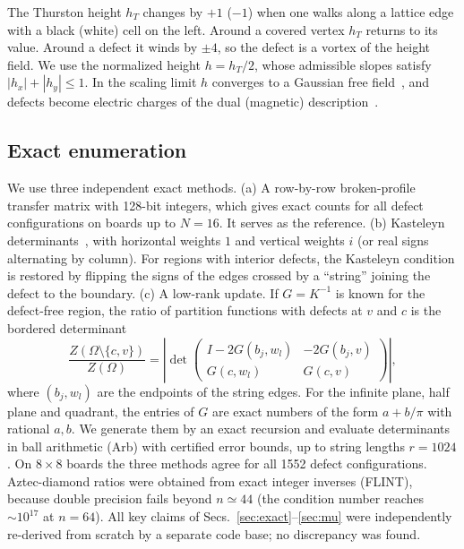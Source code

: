 \documentclass[aps,pre,twocolumn,superscriptaddress,nofootinbib,floatfix]{revtex4-2}
\begin{document}
The Thurston height $h_T$ changes by $+1$ ($-1$) when one walks along a lattice edge with a black (white) cell on the left. Around a covered vertex $h_T$ returns to its value. Around a defect it winds by $\pm4$, so the defect is a vortex of the height field. We use the normalized height $h=h_T/2$, whose admissible slopes satisfy $|h_x|+|h_y|\le1$. In the scaling limit $h$ converges to a Gaussian free field~\cite{Kenyon2000,Kenyon2001}, and defects become electric charges of the dual (magnetic) description~\cite{Nienhuis1984,Henley2010}.

\subsection{Exact enumeration}
We use three independent exact methods.
(a) A row-by-row broken-profile transfer matrix with 128-bit integers, which gives exact counts for all defect configurations on boards up to $N=16$. It serves as the reference.
(b) Kasteleyn determinants~\cite{Kasteleyn1961}, with horizontal weights $1$ and vertical weights $i$ (or real signs alternating by column). For regions with interior defects, the Kasteleyn condition is restored by flipping the signs of the edges crossed by a ``string'' joining the defect to the boundary.
(c) A low-rank update. If $G=K^{-1}$ is known for the defect-free region, the ratio of partition functions with defects at $v$ and $c$ is the bordered determinant
\begin{equation}
\frac{Z(\Omega\setminus\{c,v\})}{Z(\Omega)}=\left|\det\begin{pmatrix}I-2G(b_j,w_l) & -2G(b_j,v)\\ G(c,w_l) & G(c,v)\end{pmatrix}\right|,
\label{eq:bordered}
\end{equation}
where $(b_j,w_l)$ are the endpoints of the string edges.
For the infinite plane, half plane and quadrant, the entries of $G$ are exact numbers of the form $a+b/\pi$ with rational $a,b$. We generate them by an exact recursion and evaluate determinants in ball arithmetic (Arb) with certified error bounds, up to string lengths $r=1024$.
On $8\times8$ boards the three methods agree for all 1552 defect configurations. Aztec-diamond ratios were obtained from exact integer inverses (FLINT), because double precision fails beyond $n\simeq44$ (the condition number reaches $\sim10^{17}$ at $n=64$).
All key claims of Secs.~\ref{sec:exact}--\ref{sec:mu} were independently re-derived from scratch by a separate code base; no discrepancy was found.
\end{document}

